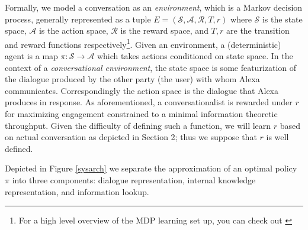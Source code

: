 \documentclass{article} %
\theoremstyle{named}
\def\scripta{{\mathcal A}}
\def\scriptr{{\mathcal R}}
\def\scripts{{\mathcal S}}
\begin{document}
Formally, we model a conversation as an \emph{environment}, which is a Markov decision process, generally represented as a tuple $ E = (\scripts, \scripta, \scriptr, T, r)$ where $ \scripts $ is the state space, $ \scripta $ is the action space, $ \scriptr $ is the reward space, and $ T, r $ are the transition and reward functions respectively\footnote{For a high level overview of the MDP learning set up, you can check out \cite{Bel}}. Given an environment, a (deterministic) agent is a map $ \pi: \scripts \to \scripta $ which takes actions conditioned on state space. In the context of a \emph{conversational environment}, the state space is some featurization of the dialogue produced by the other party (the user) with whom Alexa communicates. Correspondingly the action space is the dialogue that Alexa produces in response. As aforementioned, a conversationalist is rewarded under $ r $ for maximizing engagement constrained to a minimal information theoretic throughput. Given the difficulty of defining such a function, we will learn $ r $ based on actual conversation as depicted in Section 2; thus we suppose that $ r $ is well defined.

Depicted in Figure \ref{sysarch} we separate the approximation of an optimal policy $ \pi $ into three components: dialogue representation, internal knowledge representation, and information lookup.
\end{document}
